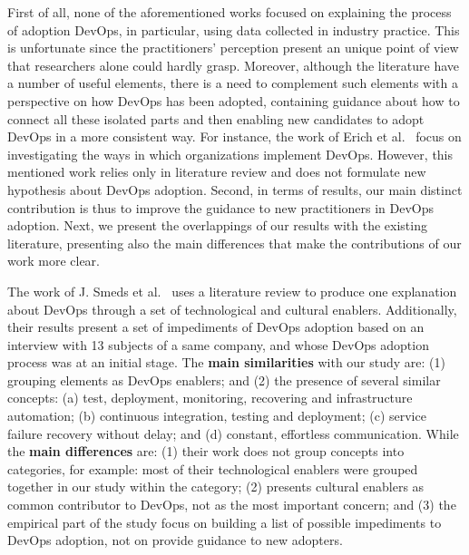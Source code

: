 

First of all, none of the aforementioned works focused on explaining the process of adoption DevOps,
in particular, using data collected in industry practice. This is unfortunate since the
practitioners' perception present an unique point of view that researchers
alone could hardly grasp. Moreover, although the literature have a number of
useful elements, there is a need to complement such elements with a perspective on how DevOps has
been adopted, containing guidance about how to connect all these isolated parts
and then enabling new candidates to adopt DevOps in a more consistent way.
For instance, the work of Erich et al.~\cite{qualitative_devops_journalsw_17}
focus on investigating the ways in which organizations implement DevOps.
However, this mentioned work relies only in literature review and does not formulate
new hypothesis about DevOps adoption. Second,
in terms of results, our main distinct contribution is thus to improve the guidance
to new practitioners in DevOps adoption.
Next, we present the overlappings of our
results with the existing literature, presenting also the main differences that
make the contributions of our work more clear.

The work of J. Smeds et al.~\cite{devops_a_definition_xp_15} uses a literature
review to produce one explanation about DevOps through a set of technological and
cultural enablers. Additionally, their results
present a set of impediments of DevOps adoption based on an interview with 13
subjects of a same company, and whose DevOps adoption process was at
an initial stage. The \textbf{main similarities} with our study are: (1) grouping
elements as DevOps enablers; and (2) the presence of several similar concepts:
(a) test, deployment, monitoring, recovering and infrastructure automation;
(b) continuous integration, testing and deployment; (c) service failure recovery
without delay; and (d) constant, effortless communication. While the \textbf{main
differences} are: (1) their work does not group concepts into categories,
for example: most of their technological enablers were grouped together in our
study within the  category; (2) presents cultural enablers as
common contributor to DevOps, not as the most important concern; and (3) the empirical
part of the study focus on building a list of possible impediments to DevOps
adoption, not on provide guidance to new adopters.

